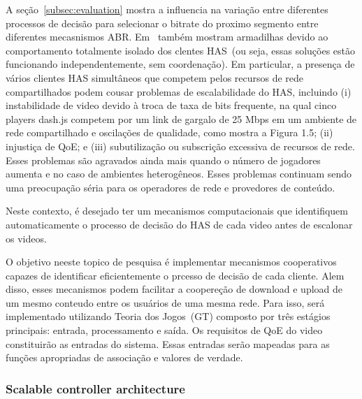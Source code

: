 A seção~\ref{subsec:evaluation} mostra a influencia na variação entre diferentes processos de decisão para selecionar o bitrate do proximo segmento entre diferentes mecasnismos ABR. Em~\cite{bentaleb:2018:MSys} também mostram armadilhas devido ao comportamento totalmente isolado dos clentes HAS~(ou seja, essas soluções estão funcionando independentemente, sem coordenação). Em particular, a presença de vários clientes HAS simultâneos que competem pelos recursos de rede compartilhados podem cousar problemas de escalabilidade do HAS, incluindo (i) instabilidade de video devido à troca de taxa de bits frequente, na qual cinco players dash.js competem por um link de gargalo de 25 Mbps em um ambiente de rede compartilhado e oscilações de qualidade, como mostra a Figura 1.5; (ii) injustiça de QoE; e (iii) subutilização ou subscrição excessiva de recursos de rede. Esses problemas são agravados ainda mais quando o número de jogadores aumenta e no caso de ambientes heterogêneos. Esses problemas continuam sendo uma preocupação séria para os operadores de rede e provedores de conteúdo.

Neste contexto, é desejado ter um mecanismos computacionais que identifiquem automaticamente o processo de decisão do HAS de cada video antes de escalonar os videos.


O objetivo neeste topico de pesquisa é implementar mecanismos cooperativos capazes de identificar eficientemente o prcesso de decisão de cada cliente. Alem disso, esses mecanismos podem facilitar a coopereção de download e upload de um mesmo conteudo entre os usuários de uma mesma rede. Para isso, será implementado utilizando Teoria dos Jogos~(GT) composto por três estágios principais: entrada, processamento e saída. Os requisitos de QoE do video constituirão as entradas do sistema. Essas entradas serão mapeadas para as funções apropriadas de associação e valores de verdade.


\subsubsection{Scalable controller architecture}
\label{subsec:sca}

